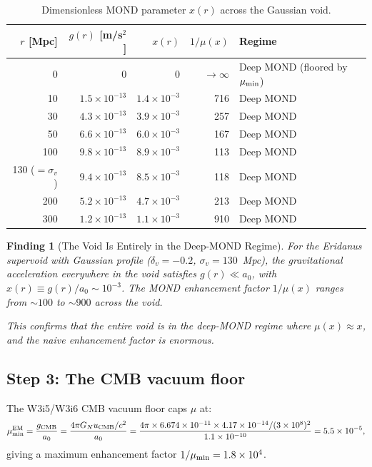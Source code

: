 \documentclass[11pt]{article}
\newtheorem{finding}{Finding}
\newcommand{\ee}[1]{\times 10^{#1}}
\newcommand{\GN}{G_N}
\newcommand{\aM}{a_0}
\newcommand{\mufd}{\mu}
\newcommand{\mumin}{\mu_{\rm min}}
\begin{document}
\begin{table}[H]
\centering
\caption{Dimensionless MOND parameter $x(r)$ across the Gaussian void.}
\label{tab:x-profile}
\begin{tabular}{rrrrl}
\toprule
$r$ [Mpc] & $g(r)$ [m/s$^2$] & $x(r)$ & $1/\mufd(x)$ & Regime \\
\midrule
0 & 0 & 0 & $\to\infty$ & Deep MOND (floored by $\mumin$) \\
10 & $1.5\ee{-13}$ & $1.4\ee{-3}$ & 716 & Deep MOND \\
30 & $4.3\ee{-13}$ & $3.9\ee{-3}$ & 257 & Deep MOND \\
50 & $6.6\ee{-13}$ & $6.0\ee{-3}$ & 167 & Deep MOND \\
100 & $9.8\ee{-13}$ & $8.9\ee{-3}$ & 113 & Deep MOND \\
130 ($=\sigma_v$) & $9.4\ee{-13}$ & $8.5\ee{-3}$ & 118 & Deep MOND \\
200 & $5.2\ee{-13}$ & $4.7\ee{-3}$ & 213 & Deep MOND \\
300 & $1.2\ee{-13}$ & $1.1\ee{-3}$ & 910 & Deep MOND \\
\bottomrule
\end{tabular}
\end{table}

\begin{finding}[The Void Is Entirely in the Deep-MOND Regime]
\label{find:deep-MOND}
For the Eridanus supervoid with Gaussian profile ($\delta_v = -0.2$,
$\sigma_v = 130$~Mpc), the gravitational acceleration everywhere in
the void satisfies $g(r) \ll \aM$, with $x(r) \equiv g(r)/\aM
\sim 10^{-3}$. The MOND enhancement factor $1/\mufd(x)$ ranges from
$\sim 100$ to $\sim 900$ across the void.

This confirms that the entire void is in the deep-MOND regime where
$\mufd(x) \approx x$, and the naive enhancement factor is enormous.
\end{finding}

\subsection{Step 3: The CMB vacuum floor}

The W3i5/W3i6 CMB vacuum floor caps $\mufd$ at:
\begin{equation}
\mumin^{\rm EM} = \frac{g_{\rm CMB}}{\aM}
= \frac{4\pi\GN u_{\rm CMB}/c^2}{\aM}
= \frac{4\pi \times 6.674\ee{-11}\times 4.17\ee{-14}/(3\ee{8})^2}{1.1\ee{-10}}
= 5.5\ee{-5},
\label{eq:mu-min}
\end{equation}
giving a maximum enhancement factor $1/\mumin = 1.8\ee{4}$.
\end{document}
